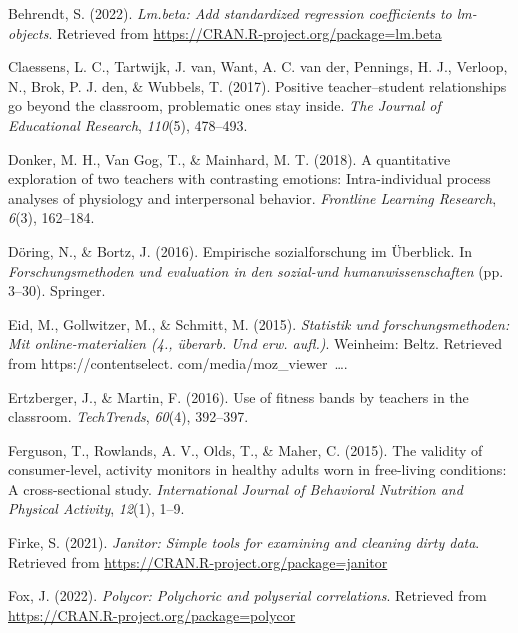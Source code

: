 \documentclass[
  man,floatsintext]{apa6}
\newlength{\cslhangindent}
\newlength{\cslentryspacingunit} %
\newenvironment{CSLReferences}[2] %
 {%
  \setlength{\parindent}{0pt}
  \ifodd #1
  \let\oldpar\par
  \def\par{\hangindent=\cslhangindent\oldpar}
  \fi
  \setlength{\parskip}{#2\cslentryspacingunit}
 }%
 {}
\begin{document}
\begin{CSLReferences}{1}{0}
\leavevmode{}%
Behrendt, S. (2022). \emph{Lm.beta: Add standardized regression coefficients to lm-objects}. Retrieved from \url{https://CRAN.R-project.org/package=lm.beta}

\leavevmode{}%
Claessens, L. C., Tartwijk, J. van, Want, A. C. van der, Pennings, H. J., Verloop, N., Brok, P. J. den, \& Wubbels, T. (2017). Positive teacher--student relationships go beyond the classroom, problematic ones stay inside. \emph{The Journal of Educational Research}, \emph{110}(5), 478--493.

\leavevmode{}%
Donker, M. H., Van Gog, T., \& Mainhard, M. T. (2018). A quantitative exploration of two teachers with contrasting emotions: Intra-individual process analyses of physiology and interpersonal behavior. \emph{Frontline Learning Research}, \emph{6}(3), 162--184.

\leavevmode{}%
Döring, N., \& Bortz, J. (2016). Empirische sozialforschung im {Ü}berblick. In \emph{Forschungsmethoden und evaluation in den sozial-und humanwissenschaften} (pp. 3--30). Springer.

\leavevmode{}%
Eid, M., Gollwitzer, M., \& Schmitt, M. (2015). \emph{Statistik und forschungsmethoden: Mit online-materialien (4., {ü}berarb. Und erw. aufl.)}. Weinheim: Beltz. Retrieved from https://contentselect. com/media/moz\_viewer~\ldots.

\leavevmode{}%
Ertzberger, J., \& Martin, F. (2016). Use of fitness bands by teachers in the classroom. \emph{TechTrends}, \emph{60}(4), 392--397.

\leavevmode{}%
Ferguson, T., Rowlands, A. V., Olds, T., \& Maher, C. (2015). The validity of consumer-level, activity monitors in healthy adults worn in free-living conditions: A cross-sectional study. \emph{International Journal of Behavioral Nutrition and Physical Activity}, \emph{12}(1), 1--9.

\leavevmode{}%
Firke, S. (2021). \emph{Janitor: Simple tools for examining and cleaning dirty data}. Retrieved from \url{https://CRAN.R-project.org/package=janitor}

\leavevmode{}%
Fox, J. (2022). \emph{Polycor: Polychoric and polyserial correlations}. Retrieved from \url{https://CRAN.R-project.org/package=polycor}


\end{CSLReferences}
\end{document}
